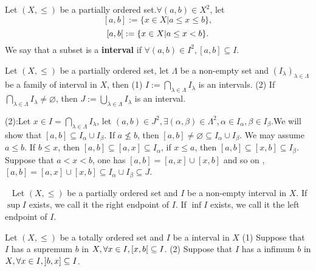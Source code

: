 \begin{definitionenv}[Intervals]
    Let $(X, \le)$ be a partially ordered set.$\forall (a, b)\in X^2$,  let 
    $$[a, b]:=\{x\in X|a\le x\le b \}, $$
     $$\interval[open right]{a}{b}:=\{x\in X|a\le x <b\}.$$ 
     We say that a subset is a \textbf{interval} if $\forall (a, b)\in I^2 , [a, b]\subseteq I$.
\end{definitionenv}
\begin{propositionenv}
    Let $(X, \le)$ be a partially ordered set,  let $\Lambda$ be a non-empty set and $(I_\lambda)_{\lambda\in \Lambda}$ be a family of interval in $X$,  then 
    \newline
    (1) $\displaystyle I:=\bigcap _{\lambda\in \Lambda}I_\lambda$ is an intervals.
    \newline
    (2) If $\displaystyle \bigcap _{\lambda\in \Lambda}I_\lambda\not=\varnothing $, then $\displaystyle J:=\bigcup_{\lambda\in \Lambda}I_\lambda$ is an interval.
\end{propositionenv}
\begin{proofenv}
    \quad 
    \newline
    (2):Let $x\in I=\bigcap _{\lambda\in \Lambda}I_\lambda$, let $(a, b)\in J^2, \exists (\alpha, \beta )\in \Lambda^2, \alpha\in I_\alpha, \beta\in I_\beta$.We will show that $[a, b]\subseteq I_\alpha\cup I_\beta$. If $a\not\le b $,  then $[a, b]\not =\varnothing\subseteq I_\alpha\cup I_\beta $. We may assume $a\le b $.
    \newline 
    If $b\le x$,  then $[a, b]\subseteq [a, x]\subseteq I_\alpha$,  if $x\le a $,  then $[a, b]\subseteq [x, b]\subseteq I_\beta$. Suppose that $a<x<b$,  one has $[a, b]=[a, x]\cup[x, b]$ and so on ,  $[a, b]=[a, x]\cup[x, b]\subseteq I_\alpha\cup I_\beta \subseteq J$.

\end{proofenv}
\begin{definitionenv}[Endpoints]
    \ \newline
    Let $(X, \le )$ be a partially ordered set and $I $ be a non-empty interval in $X$. 
    \newline
    If $\sup I$ exists,  we call it the right endpoint of $I$.
    \newline
    If $\inf I$ exists,  we call it the left endpoint of $I$.
\end{definitionenv}
\begin{propositionenv}
   Let $(X, \le )$ be a totally ordered set and $I $ be a interval in $X$ 
   \newline
   (1) Suppose that $I$ has a supremum $b$ in $X, \forall x\in I, \interval[open right]{x}{b}\subseteq I$.
   \newline
   (2) Suppose that $I$ has a infimum $b$ in $X, \forall x\in I, \interval[open left]{b}{x}\subseteq I$.
\end{propositionenv}
